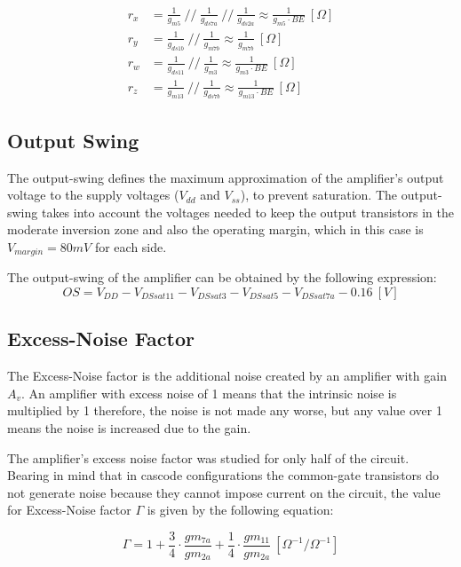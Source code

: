 \begin{align}
    r_x &= \frac{1}{g_{m5}} \ // \ \frac{1}{g_{ds7a}} \ // \ \frac{1}{g_{ds2a}}\approx \frac{1}{g_{m5} \cdot BE} \ [\Omega]\\
    r_y &= \frac{1}{g_{ds1b}} \ // \ \frac{1}{g_{m7b}} \approx \frac{1}{g_{m7b}} \ [\Omega]\\
    r_w &= \frac{1}{g_{ds11}} \ // \ \frac{1}{g_{m3}} \approx \frac{1}{g_{m3} \cdot BE} \ [\Omega]\\
    r_z &= \frac{1}{g_{m13}} \ // \ \frac{1}{g_{ds7b}} \approx \frac{1}{g_{m13} \cdot BE} \ [\Omega]
    \label{eq:resistances}
\end{align}

\subsection{Output Swing}
The output-swing defines the maximum approximation of the amplifier's output voltage to the supply voltages ($V_{dd}$ and $V_{ss}$), to prevent saturation. The output-swing takes into account the voltages needed to keep the output transistors in the moderate inversion zone and also the operating margin, which in this case is $V_{margin}=80mV$ for each side.

The output-swing of the amplifier can be obtained by the following expression:
\begin{equation}
    OS = V_{DD} - V_{DSsat11} - V_{DSsat3} - V_{DSsat5} - V_{DSsat7a} - 0.16 \ [V]
    \label{eq:OS}
\end{equation}

\subsection{Excess-Noise Factor}
The Excess-Noise factor is the additional noise created by an amplifier with gain $A_v$. An amplifier with excess noise of 1 means that the intrinsic noise is multiplied by 1 therefore, the noise is not made any worse, but any value over 1 means the noise is increased due to the gain.

The amplifier's excess noise factor was studied for only half of the circuit. Bearing in mind that in cascode configurations the common-gate transistors do not generate noise because they cannot impose current on the circuit, the value for Excess-Noise factor $\Gamma$ is given by the following equation:

\begin{equation}
    \Gamma = 1 + \frac{3}{4}\cdot \frac{gm_{7a}}{gm_{2a}} + \frac{1}{4}\cdot \frac{gm_{11}}{gm_{2a}} \ [\Omega ^{-1} / \Omega ^{-1}]
    \label{eq:ENF}
\end{equation}


